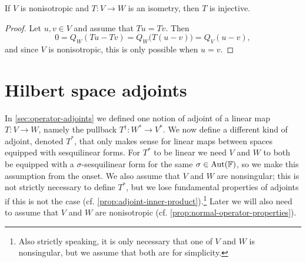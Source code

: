 \documentclass[a4paper, 11pt]{memoir}
\theoremstyle{plaincustomnumber}
\theoremstyle{changedotbreakcustomnumber}
\newcommand{\field}{\mathbb{F}}
\newcommand{\vecU}[1]{\mathrm{U}(#1)}
\newcommand{\vecO}[1]{\mathrm{O}(#1)}
\newcommand{\vecSp}[1]{\mathrm{Sp}(#1)}
\newcommand{\keyword}[1]{\ifbool{indefinition}{{\itshape #1}}{{\itshape\bfseries #1}}}
\begin{document}
\begin{lemma}
    \label{lem:isometry-injective}
    If $V$ is nonisotropic and $T \colon V \to W$ is an isometry, then $T$ is injective.
\end{lemma}

\begin{proof}
    Let $u,v \in V$ and assume that $Tu = Tv$. Then
    \begin{equation*}
        0
            = Q_W(Tu - Tv)
            = Q_W \bigl( T(u-v) \bigr)
            = Q_V(u-v),
    \end{equation*}
    and since $V$ is nonisotropic, this is only possible when $u = v$.
\end{proof}







\section{Hilbert space adjoints}

\newpar\label{par:Hilbert-space-adjoints}

In \cref{sec:operator-adjoints} we defined one notion of adjoint of a linear map $T \colon V \to W$, namely the pullback $T^\dagger \colon W^* \to V^*$. We now define a different kind of adjoint, denoted $T^*$, that only makes sense for linear maps between spaces equipped with sesquilinear forms. For $T^*$ to be linear we need $V$ and $W$ to both be equipped with a $\sigma$-sesquilinear form for the same $\sigma \in \Aut(\field)$, so we make this assumption from the onset. We also assume that $V$ and $W$ are nonsingular; this is not strictly necessary to define $T^*$, but we lose fundamental properties of adjoints if this is not the case (cf. \cref{prop:adjoint-inner-product}).\footnote{Also strictly speaking, it is only necessary that one of $V$ and $W$ is nonsingular, but we assume that both are for simplicity.} Later we will also need to assume that $V$ and $W$ are nonisotropic (cf. \cref{prop:normal-operator-properties}).
\end{document}
